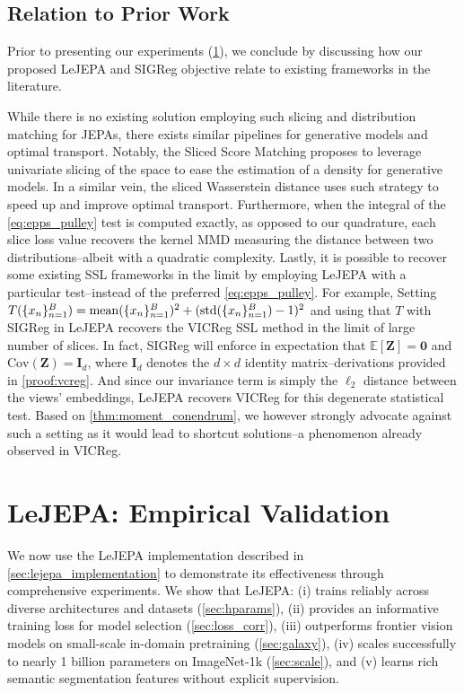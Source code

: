 \subsection{Relation to Prior Work}

Prior to presenting our experiments (\cref{sec:experiments}), we conclude  by discussing how our proposed LeJEPA and SIGReg objective relate to existing frameworks in the literature.

While there is no existing solution employing such slicing and distribution matching for JEPAs, there exists similar pipelines for generative models and optimal transport. Notably, the Sliced Score Matching \citep{song2020sliced} proposes to leverage univariate slicing of the space to ease the estimation of a density for generative models. In a similar vein, the sliced Wasserstein distance \citep{bonneel2015sliced,nguyen2023energy} uses such strategy to speed up and improve optimal transport. Furthermore, when the integral of the \eqref{eq:epps_pulley} test is computed exactly, as opposed to our quadrature, each slice loss value recovers the kernel MMD \citep{sriperumbudur2010hilbert,gretton2012kernel,chwialkowski2016kernel} measuring the distance between two distributions--albeit with a quadratic complexity. Lastly, it is possible to recover some existing SSL frameworks in the limit by employing LeJEPA with a particular test--instead of the preferred \eqref{eq:epps_pulley}. For example,  
Setting $T(\{x_n\}_{n=1}^{B})={\rm mean}(\{x_n\}_{n=1}^{B})^2+({\rm std}(\{x_n\}_{n=1}^{B})-1)^2$ and using that $T$ with SIGReg in LeJEPA recovers the VICReg SSL method in the limit of large number of slices. In fact, SIGReg will enforce in expectation that  $\mathbb{E}[\mathbf{Z}] = \mathbf{0}$ and $\mathrm{Cov}(\mathbf{Z}) = \mathbf{I}_d$, where $\mathbf{I}_d$ denotes the $d \times d$ identity matrix--derivations provided in \cref{proof:vcreg}. And since our invariance term is simply the $\ell_2$ distance between the views' embeddings, LeJEPA recovers VICReg for this degenerate statistical test. Based on \cref{thm:moment_conendrum}, we however strongly advocate against such a setting as it would lead to shortcut solutions--a phenomenon already observed in VICReg.




\section{LeJEPA: Empirical Validation}
\label{sec:experiments}


We now use the LeJEPA implementation described in \cref{sec:lejepa_implementation} 
to demonstrate its effectiveness through comprehensive experiments. We show that 
LeJEPA: (i) trains reliably across diverse architectures and datasets 
(\cref{sec:hparams}), (ii) provides an informative training loss for model 
selection (\cref{sec:loss_corr}), (iii) outperforms frontier vision models on 
small-scale in-domain pretraining (\cref{sec:galaxy}), (iv) scales successfully 
to nearly 1 billion parameters on 
ImageNet-1k (\cref{sec:scale}), and (v) learns rich semantic segmentation 
features without explicit supervision.



